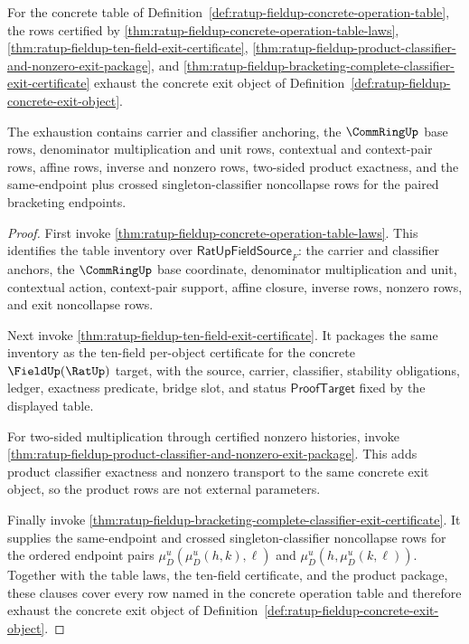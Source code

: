 \begin{theorem}
\label{thm:ratup-fieldup-concrete-operation-exit-exhaustion}
For the concrete table of
Definition~\ref{def:ratup-fieldup-concrete-operation-table}, the rows certified
by
\autoref{thm:ratup-fieldup-concrete-operation-table-laws},
\autoref{thm:ratup-fieldup-ten-field-exit-certificate},
\autoref{thm:ratup-fieldup-product-classifier-and-nonzero-exit-package}, and
\autoref{thm:ratup-fieldup-bracketing-complete-classifier-exit-certificate}
exhaust the concrete exit object of
Definition~\ref{def:ratup-fieldup-concrete-exit-object}.

The exhaustion contains carrier and classifier anchoring, the $\CommRingUp$ base
rows, denominator multiplication and unit rows, contextual and context-pair rows,
affine rows, inverse and nonzero rows, two-sided product exactness, and the
same-endpoint plus crossed singleton-classifier noncollapse rows for the paired
bracketing endpoints.
\end{theorem}
\begin{proof}
First invoke \autoref{thm:ratup-fieldup-concrete-operation-table-laws}. This
identifies the table inventory over $\mathsf{RatUpFieldSource}_F$: the carrier
and classifier anchors, the $\CommRingUp$ base coordinate, denominator
multiplication and unit, contextual action, context-pair support, affine
closure, inverse rows, nonzero rows, and exit noncollapse rows.

Next invoke \autoref{thm:ratup-fieldup-ten-field-exit-certificate}. It packages
the same inventory as the ten-field per-object certificate for the concrete
$\FieldUp(\RatUp)$ target, with the source, carrier, classifier, stability
obligations, ledger, exactness predicate, bridge slot, and status
$\mathsf{ProofTarget}$ fixed by the displayed table.

For two-sided multiplication through certified nonzero histories, invoke
\autoref{thm:ratup-fieldup-product-classifier-and-nonzero-exit-package}. This
adds product classifier exactness and nonzero transport to the same concrete
exit object, so the product rows are not external parameters.

Finally invoke
\autoref{thm:ratup-fieldup-bracketing-complete-classifier-exit-certificate}.
It supplies the same-endpoint and crossed singleton-classifier noncollapse rows
for the ordered endpoint pairs
$\mu_D^u(\mu_D^u(h,k),\ell)$ and $\mu_D^u(h,\mu_D^u(k,\ell))$. Together with the
table laws, the ten-field certificate, and the product package, these clauses
cover every row named in the concrete operation table and therefore exhaust the
concrete exit object of Definition~\ref{def:ratup-fieldup-concrete-exit-object}.
\end{proof}

